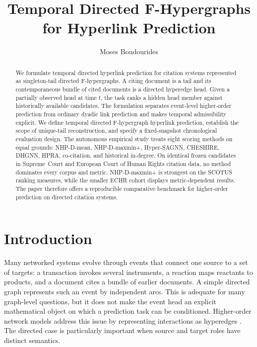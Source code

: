 \documentclass{svproc}
\begin{document}
\mainmatter

\title{Temporal Directed F-Hypergraphs for Hyperlink Prediction}
\author{Moses Boudourides}
\maketitle

\begin{abstract}
We formulate temporal directed hyperlink prediction for citation systems represented as singleton-tail directed F-hypergraphs. A citing document is a tail and its contemporaneous bundle of cited documents is a directed hyperedge head. Given a partially observed head at time $t$, the task ranks a hidden head member against historically available candidates. The formulation separates event-level higher-order prediction from ordinary dyadic link prediction and makes temporal admissibility explicit. We define temporal directed F-hypergraph hyperlink prediction, establish the scope of unique-tail reconstruction, and specify a fixed-snapshot chronological evaluation design. The autonomous empirical study treats eight scoring methods on equal grounds: NHP-D-mean, NHP-D-maxmin+, Hyper-SAGNN, CHESHIRE, DHGNN, HPRA, co-citation, and historical in-degree. On identical frozen candidates in Supreme~Court and European Court of Human Rights citation data, no method dominates every corpus and metric. NHP-D-maxmin+ is strongest on the SCOTUS ranking measures, while the smaller ECHR cohort displays metric-dependent results. The paper therefore offers a reproducible comparative benchmark for higher-order prediction on directed citation systems.
\end{abstract}

\section{Introduction}

Many networked systems evolve through events that connect one source to a set of targets: a transaction invokes several instruments, a reaction maps reactants to products, and a document cites a bundle of earlier documents. A simple directed graph represents such an event by independent arcs. This is adequate for many graph-level questions, but it does not make the event head an explicit mathematical object on which a prediction task can be conditioned. Higher-order network models address this issue by representing interactions as hyperedges \cite{berge1973graphs,gallo1993directed}. The directed case is particularly important when source and target roles have distinct semantics.
\end{document}
